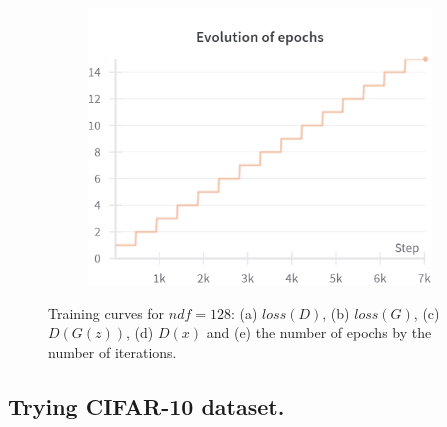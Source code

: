 \begin{figure}[H]
    \begin{subfigure}{0.45\textwidth}
        \centering
        \includegraphics[width=0.95\linewidth]{ndf/128/epochs.png}
        \caption{}
        \label{subfig:ndf/128/epochs}
    \end{subfigure}%

    \caption{Training curves for $ndf=128$: (a) $loss(D)$, (b) $loss(G)$, (c) $D(G(z))$, (d) $D(x)$ and (e) the number of epochs by the number of iterations.}
    \label{fig:ndf/128_losses}
\end{figure}

\subsection{Trying CIFAR-10 dataset.} \label{appendix:cifar10_32}

